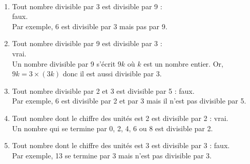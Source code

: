    \ \\ [-5mm]
   \begin{enumerate}
      \item Tout nombre divisible par 3 est divisible par 9 : \\
         {\blue faux}. \\
         Par exemple, 6 est divisible par 3 mais pas par 9.
      \item Tout nombre divisible par 9 est divisible par 3 : \\
         {\blue vrai}. \\
         Un nombre divisible par 9 s'écrit $9k$ où $k$ est un nombre entier. Or, $9k =3\times(3k)$ donc il est aussi divisible par 3.
      \item Tout nombre divisible par 2 et 3 est divisible par 5 : {\blue faux}. \\
      Par exemple, 6 est divisible par 2 et par 3 mais il n'est pas divisible par 5.
      \item Tout nombre dont le chiffre des unités est 2 est divisible par 2 : {\blue vrai}. \\
      Un nombre qui se termine par 0, 2, 4, 6 ou 8 est divisible par 2.
      \item Tout nombre dont le chiffre des unités est 3 est divisible par 3 : {\blue faux}. \\
      Par exemple, 13 se termine par 3 mais n'est pas divisible par 3.
   \end{enumerate}
